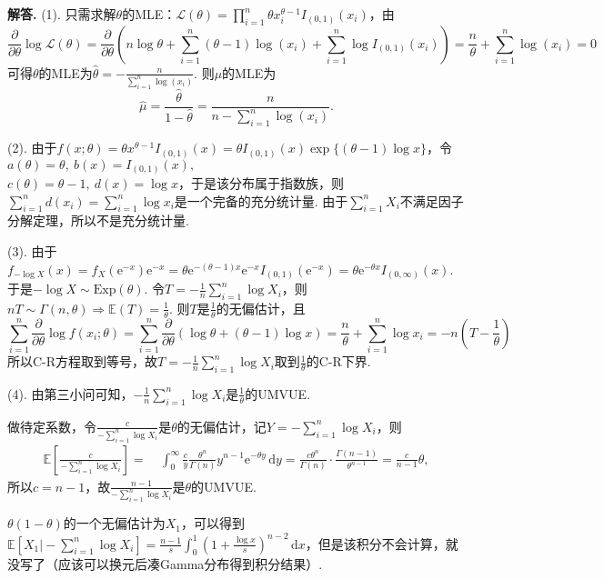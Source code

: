 \documentclass[12pt, a4paper, oneside]{ctexart}
\newenvironment{solution}[1][]{\par\noindent\textbf{#1解答. }}{\smallskip\par}  %
\def\E{\mathbb{E}}          %
\def\d{\mathrm{d}}          %
\def\e{\mathrm{e}}          %
\def\L{\mathcal{L}}         %
\def\add{\vspace{1ex}}      %
\begin{document}
\begin{solution}
    (1). 只需求解$\theta$的MLE：$\L(\theta) = \prod_{i=1}^n\theta x_i^{\theta-1}I_{(0,1)}(x_i)$，由
    \begin{equation*}
        \frac{\partial}{\partial \theta}\log\L(\theta) = \frac{\partial}{\partial \theta}\left(n\log\theta+\sum_{i=1}^n(\theta-1)\log(x_i)+\sum_{i=1}^n\log I_{(0,1)}(x_i)\right) = \frac{n}{\theta}+\sum_{i=1}^n\log(x_i) = 0
    \end{equation*}
    可得$\theta$的MLE为$\hat{\theta} = -\frac{n}{\sum_{i=1}^n\log(x_i)}$. 则$\mu$的MLE为
    \begin{equation*}
        \hat{\mu} = \frac{\hat{\theta}}{1-\hat{\theta}} = \frac{n}{n-\sum_{i=1}^n\log(x_i)}.
    \end{equation*}
    
    (2). 由于$f(x;\theta) = \theta x^{\theta-1}I_{(0,1)}(x) = \theta I_{(0,1)}(x)\exp\{(\theta-1)\log x\}$，令$a(\theta) = \theta,\ b(x)  = I_{(0,1)}(x),$\\$c(\theta) = \theta-1,\ d(x) = \log x$，于是该分布属于指数族，则$\sum_{i=1}^nd(x_i) = \sum_{i=1}^n\log x_i$是一个完备的充分统计量. 由于$\sum_{i=1}^nX_i$不满足因子分解定理，所以不是充分统计量.

    (3). 由于$f_{-\log X}(x) = f_X(\e^{-x})\e^{-x} = \theta\e^{-(\theta-1)x}\e^{-x}I_{(0,1)}(\e^{-x})=\theta\e^{-\theta x}I_{(0,\infty)}(x)$. \add 于是$-\log X\sim \text{Exp}(\theta)$. 令$T = -\frac{1}{n}\sum_{i=1}^n\log X_i$，则$nT\sim\Gamma(n,\theta) \Rightarrow \E(T) = \frac{1}{\theta}$. 则$T$是$\frac{1}{\theta}$的无偏估计，且
    \begin{equation*}
        \sum_{i=1}^n\frac{\partial}{\partial\theta}\log f(x_i;\theta) = \sum_{i=1}^n\frac{\partial}{\partial\theta}(\log\theta+(\theta-1)\log x)=\frac{n}{\theta}+\sum_{i=1}^n\log x_i= -n\left(T-\frac{1}{\theta}\right)
    \end{equation*}
    所以C-R方程取到等号，故$T=-\frac{1}{n}\sum_{i=1}^n\log X_i$取到$\frac{1}{\theta}$的C-R下界.

    (4). 由第三小问可知，$-\frac{1}{n}\sum_{i=1}^n\log X_i$是$\frac{1}{\theta}$的UMVUE.

    做待定系数，令$\frac{c}{-\sum_{i=1}^n\log X_i}$是$\theta$的无偏估计，记$Y = -\sum_{i=1}^n\log X_i$，则
    \begin{align*}
        \E\left[\frac{c}{-\sum_{i=1}^n\log X_i}\right] =&\ \int_0^\infty\frac{c}{y}\frac{\theta^n}{\Gamma(n)}y^{n-1}\e^{-\theta y}\,\d y
        = \frac{c\theta^n}{\Gamma(n)}\cdot\frac{\Gamma(n-1)}{\theta^{n-1}} = \frac{c}{n-1}\theta,
    \end{align*}
    所以$c = n-1$，故$\frac{n-1}{-\sum_{i=1}^n\log X_i}$是$\theta$的UMVUE.
    
    $\theta(1-\theta)$的一个无偏估计为$X_1$，可以得到$\E\left[X_1\biggl|-\sum_{i=1}^n\log X_i\right]=\frac{n-1}{s}\int_0^1(1+\frac{\log x}{s})^{n-2}\,\d x$，但是该积分不会计算，就没写了（应该可以换元后凑Gamma分布得到积分结果）.\add
\end{solution}
\end{document}
